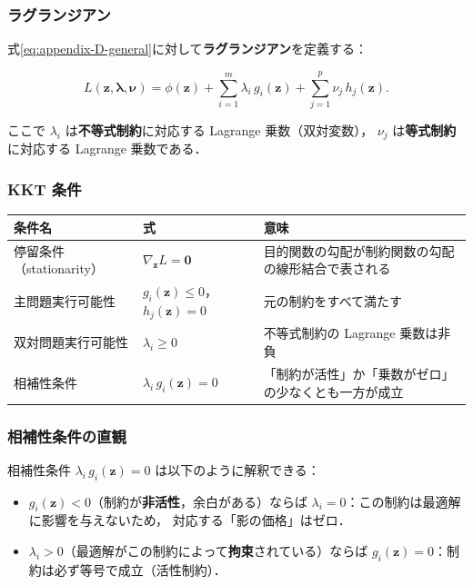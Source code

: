 \subsubsection*{ラグランジアン}

式\eqref{eq:appendix-D-general}に対して\textbf{ラグランジアン}を定義する：

\begin{equation}
  L(\boldsymbol{z}, \boldsymbol{\lambda}, \boldsymbol{\nu})
  = \phi(\boldsymbol{z})
    + \sum_{i=1}^m \lambda_i\, g_i(\boldsymbol{z})
    + \sum_{j=1}^p \nu_j\, h_j(\boldsymbol{z}).
  \label{eq:appendix-D-lagrangian}
\end{equation}

ここで $\lambda_i$ は\textbf{不等式制約}に対応する Lagrange 乗数（双対変数），
$\nu_j$ は\textbf{等式制約}に対応する Lagrange 乗数である．

\subsubsection*{KKT 条件}

\begin{center}
\small
\begin{tabular}{l p{} p{}}
  \toprule
  条件名 & 式 & 意味 \\
  \midrule
  停留条件（stationarity） & $\nabla_{\boldsymbol{z}} L = \boldsymbol{0}$ &
    目的関数の勾配が制約関数の勾配の線形結合で表される \\[3pt]
  主問題実行可能性 & $g_i(\boldsymbol{z}) \leq 0$，$h_j(\boldsymbol{z}) = 0$ &
    元の制約をすべて満たす \\[3pt]
  双対問題実行可能性 & $\lambda_i \geq 0$ &
    不等式制約の Lagrange 乗数は非負 \\[3pt]
  相補性条件 & $\lambda_i\, g_i(\boldsymbol{z}) = 0$ &
    「制約が活性」か「乗数がゼロ」の少なくとも一方が成立 \\
  \bottomrule
\end{tabular}
\end{center}

\subsubsection*{相補性条件の直観}

相補性条件 $\lambda_i\, g_i(\boldsymbol{z}) = 0$ は以下のように解釈できる：

\begin{itemize}
  \item $g_i(\boldsymbol{z}) < 0$（制約が\textbf{非活性}，余白がある）ならば
        $\lambda_i = 0$：この制約は最適解に影響を与えないため，
        対応する「影の価格」はゼロ．
  \item $\lambda_i > 0$（最適解がこの制約によって\textbf{拘束}されている）ならば
        $g_i(\boldsymbol{z}) = 0$：制約は必ず等号で成立（活性制約）．
\end{itemize}

